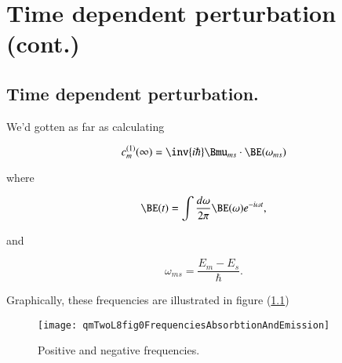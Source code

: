 %
%

%
%

\chapter{Time dependent perturbation (cont.)}
\label{chap:qmTwoL8}
{}
\date{Oct 3, 2011}

\beginArtWithToc

%

\section{Time dependent perturbation.}

We'd gotten as far as calculating

\begin{equation}\label{eqn:qmTwoL8:10}
c_m^{(1)}(\infty) = \inv{i \hbar} \Bmu_{ms} \cdot \BE(\omega_{ms})
\end{equation}

where

\begin{equation}\label{eqn:qmTwoL8:30}
\BE(t) = \int \frac{d\omega}{2 \pi} \BE(\omega) e^{-i \omega t},
\end{equation}

and

\begin{equation}\label{eqn:qmTwoL8:50}
\omega_{ms} = \frac{E_m - E_s}{\hbar}.
\end{equation}

Graphically, these frequencies are illustrated in figure (\ref{fig:qmTwoL8fig0FrequenciesAbsorbtionAndEmission})
%
\begin{figure}[htp]
\centering
\texttt{[image: qmTwoL8fig0FrequenciesAbsorbtionAndEmission]}
\caption{Positive and negative frequencies.}\label{fig:qmTwoL8fig0FrequenciesAbsorbtionAndEmission}
\end{figure}

